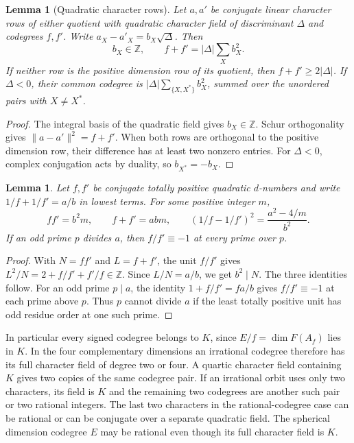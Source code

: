 \documentclass[11pt,reqno]{amsart}
\newtheorem{lemma}[theorem]{Lemma}
\theoremstyle{remark}\newtheorem{remark}[theorem]{Remark}
\numberwithin{equation}{section}
\begin{document}
\begin{lemma}[Quadratic character rows]\label{lem:quadratic-row-difference}
Let $a,a'$ be conjugate linear character rows of either quotient
with quadratic character field of discriminant $\Delta$ and
codegrees $f,f'$. Write $a_X-a'_X=b_X\sqrt\Delta$. Then
\begin{equation}\label{eq:quad-row-trace}
      b_X\in\mathbb Z,\qquad f+f'=|\Delta|\sum_X b_X^2 .
\end{equation}
If neither row is the positive dimension row of its quotient, then
$f+f'\ge2|\Delta|$. If $\Delta<0$, their common codegree is
$|\Delta|\sum_{\{X,X^*\}}b_X^2$, summed over the unordered
pairs with $X\ne X^*$.
\end{lemma}
\begin{proof}
The integral basis of the quadratic field gives $b_X\in\mathbb Z$.
Schur orthogonality gives $\|a-a'\|^2=f+f'$.
When both rows are orthogonal to the positive dimension row,
their difference has at least two nonzero entries. For $\Delta<0$,
complex conjugation acts by duality, so $b_{X^*}=-b_X$.
\end{proof}

\begin{lemma}\label{lem:fixed-quadratic-mass}
Let $f,f'$ be conjugate totally positive quadratic $d$-numbers
and write $1/f+1/f'=a/b$ in lowest terms. For some positive integer $m$,
\[
 ff'=b^2m,\qquad f+f'=abm,\qquad
 (1/f-1/f')^2=\frac{a^2-4/m}{b^2}.
\]
If an odd prime $p$ divides $a$, then $f/f'\equiv-1$ at
every prime over $p$.
\end{lemma}
\begin{proof}
With $N=ff'$ and $L=f+f'$, the unit $f/f'$ gives
$L^2/N=2+f/f'+f'/f\in\mathbb Z$. Since $L/N=a/b$, we get
$b^2\mid N$. The three identities follow.
For an odd prime $p\mid a$, the identity
$1+f/f'=fa/b$ gives $f/f'\equiv-1$ at each prime above $p$.
Thus $p$ cannot divide $a$ if the least totally positive unit has
odd residue order at one such prime.
\end{proof}

In particular every signed codegree belongs to $K$, since $E/f=\dim F(A_f)$ lies in $K$. In the four complementary dimensions an irrational codegree therefore has its full character field of degree two or four. A quartic character field containing $K$ gives two copies of the same codegree pair. If an irrational orbit uses only two characters, its field is $K$ and the remaining two codegrees are another such pair or two rational integers. The last two characters in the rational-codegree case can be rational or can be conjugate over a separate quadratic field. The spherical dimension codegree $E$ may be rational even though its full character field is $K$.
\end{document}
